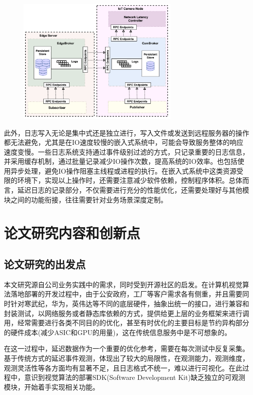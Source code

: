 \documentclass[master,anonymous]{shtthesis}
\begin{document}
\begin{figure}[htbp]
	\centering
	\includegraphics[width=8cm]{img/rpc_log.png}
	\label{基于发布订阅的边缘计算日志系统}
\end{figure}

此外，日志写入无论是集中式还是独立进行，写入文件或发送到远程服务器的操作都无法避免，尤其是在IO速度较慢的嵌入式系统中，可能会导致服务整体的响应速度变慢。一些日志系统支持通过事件级别过滤的方式，只记录重要的日志信息，并采用缓存机制，通过批量记录减少IO操作次数，提高系统的IO效率。也包括使用异步处理，避免IO操作阻塞主线程或进程的执行。在嵌入式系统中这类资源受限的环境下，实现以上操作时，还需要注意减少软件依赖，控制程序体积。总体而言，延迟日志的记录部分，不仅需要进行充分的性能优化，还需要处理好与其他模块之间的功能衔接，往往需要针对业务场景深度定制。

\section{论文研究内容和创新点}\label{论文研究内容和创新点}
\subsection{论文研究的出发点}\label{论文研究的出发点}
本文研究源自公司业务实践中的需求，同时受到开源社区的启发。在计算机视觉算法落地部署的开发过程中，由于公安政府，工厂等客户需求各有侧重，并且需要同时针对寒武纪，华为，英伟达等不同的底层硬件，抽象出统一的接口，进行兼容和封装测试，以网络服务或者静态库依赖的方式，提供给更上层的业务框架来进行调用，经常需要进行各类不同目的的优化，甚至有时优化的主要目标是节约异构部分的硬件成本(减少ASIC和GPU的用量)，这在传统信息服务中是不可想象的。

在这一过程中，延迟数据作为一个重要的优化参考，需要在每次测试中反复采集。基于传统方式的延迟事件观测，体现出了较大的局限性，在观测能力，观测维度，观测灵活性等各方面均有显著不足，且日志格式不统一，难以进行可视化。在此过程中，意识到视觉算法的部署SDK(Software Development Kit)缺乏独立的可观测模块，开始着手实现相关功能。
\end{document}

